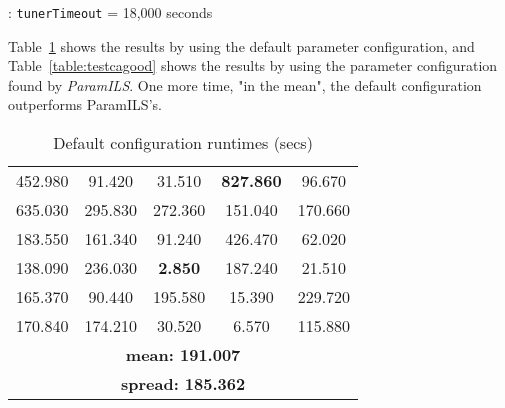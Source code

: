 \begin{table}[h]
\centering 
\renewcommand{\arraystretch}{1.2}
\caption{\carr{}: \texttt{tunerTimeout} = 18,000 seconds}\label{table:ca1}
\end{table}

Table~\ref{table:testcabad} shows the results by using the default parameter configuration, and Table~\ref{table:testcagood} shows the results by using the parameter configuration found by {\it ParamILS}. One more time, "in the mean", the default configuration outperforms {\sc ParamILS}'s.

\begin{table}[h]
\centering
\renewcommand{\arraystretch}{1.2}
\begin{tabular}{|ccccc|}
	\hline
	452.980 & 91.420 & 31.510 & \textcolor{intenso}{\bf 827.860} & 96.670 \\ 
	635.030 & 295.830 & 272.360 & 151.040 & 170.660 \\  
	\hline 
	183.550 & 161.340 & 91.240 & 426.470 & 62.020 \\ 
	138.090 & 236.030 & \textcolor{naranja}{\bf 2.850} & 187.240 & 21.510 \\  
	\hline 
	165.370 & 90.440 & 195.580 & 15.390 & 229.720 \\ 
	170.840 & 174.210 & 30.520 & 6.570 & 115.880 \\  
	\hline
	\multicolumn{5}{|c|}{\bf mean: 191.007}\\
	\multicolumn{5}{|c|}{\bf spread: 185.362}\\
	\hline
\end{tabular}
\caption{Default configuration runtimes (secs)}\label{table:testcabad}
\end{table}

